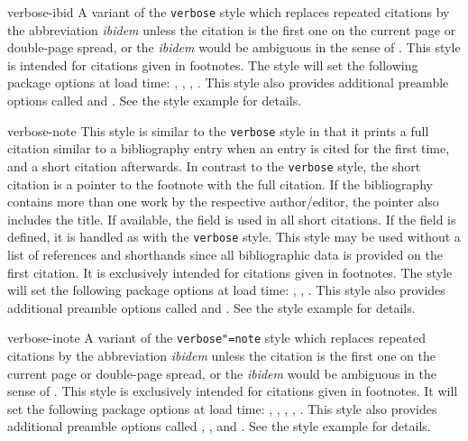 \documentclass{ltxdockit}[2011/03/25]
\begin{document}
\begin{marglist}
\item[verbose-ibid]
A variant of the \texttt{verbose} style which replaces repeated citations by the abbreviation \emph{ibidem} unless the citation is the first one on the current page or double-page spread, or the \emph{ibidem} would be ambiguous in the sense of . This style is intended for citations given in footnotes. The style will set the following package options at load time: , , , . This style also provides additional preamble options called  and . See the style example for details.

\item[verbose-note]
This style is similar to the \texttt{verbose} style in that it prints a full citation similar to a bibliography entry when an entry is cited for the first time, and a short citation afterwards. In contrast to the \texttt{verbose} style, the short citation is a pointer to the footnote with the full citation. If the bibliography contains more than one work by the respective author\slash editor, the pointer also includes the title. If available, the  field is used in all short citations. If the  field is defined, it is handled as with the \texttt{verbose} style. This style may be used without a list of references and shorthands since all bibliographic data is provided on the first citation. It is exclusively intended for citations given in footnotes. The style will set the following package options at load time: , , . This style also provides additional preamble options called  and . See the style example for details.

\item[verbose-inote]
A variant of the \texttt{verbose"=note} style which replaces repeated citations by the abbreviation \emph{ibidem} unless the citation is the first one on the current page or double-page spread, or the \emph{ibidem} would be ambiguous in the sense of . This style is exclusively intended for citations given in footnotes. It will set the following package options at load time: , , , , . This style also provides additional preamble options called , , and . See the style example for details.


\end{marglist}
\end{document}
